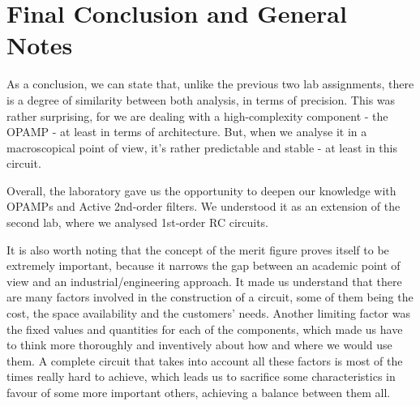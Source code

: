 \section{Final Conclusion and General Notes}
\label{sec:conclusion}

As a conclusion, we can state that, unlike the previous two lab assignments, there is a degree of similarity between both analysis, in terms of precision. This was rather surprising, for we are dealing with a high-complexity component - the OPAMP - at least in terms of architecture. But, when we analyse it in a macroscopical point of view, it's rather predictable and stable - at least in this circuit. 

Overall, the laboratory gave us the opportunity to deepen our knowledge with OPAMPs and Active 2nd-order filters. We understood it as an extension of the second lab, where we analysed 1st-order RC circuits. 

It is also worth noting that the concept of the merit figure proves itself to be extremely important, because it narrows the gap between an academic point of view and an industrial/engineering approach. It made us understand that there are many factors involved in the construction of a circuit, some of them being the cost, the space availability and the customers' needs. Another limiting factor was the fixed values and quantities for each of the components, which made us have to think more thoroughly and inventively about how and where we would use them. A complete circuit that takes into account all these factors is most of the times really hard to achieve, which leads us to sacrifice some characteristics in favour of some more important others, achieving a balance between them all.

